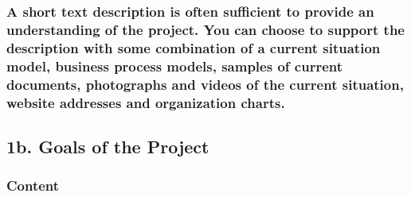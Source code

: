 \documentclass[
]{article}
\begin{document}
\hypertarget{a-short-text-description-is-often-sufficient-to-provide-an-understanding-of-the-project.-you-can-choose-to-support-the-description-with-some-combination-of-a-current-situation-model-business-process-models-samples-of-current-documents-photographs-and-videos-of-the-current-situation-website-addresses-and-organization-charts.}{%
\subsubsection{A short text description is often sufficient to provide
an understanding of the project. You can choose to support the
description with some combination of a current situation model, business
process models, samples of current documents, photographs and videos of
the current situation, website addresses and organization
charts.}\label{a-short-text-description-is-often-sufficient-to-provide-an-understanding-of-the-project.-you-can-choose-to-support-the-description-with-some-combination-of-a-current-situation-model-business-process-models-samples-of-current-documents-photographs-and-videos-of-the-current-situation-website-addresses-and-organization-charts.}}

\hypertarget{b.-goals-of-the-project}{%
\subsection{\texorpdfstring{1b. Goals of the Project
}{1b. Goals of the Project }}\label{b.-goals-of-the-project}}

\hypertarget{content-1}{%
\subsubsection{Content}\label{content-1}}
\end{document}

